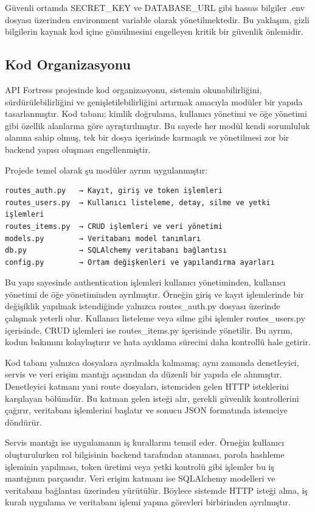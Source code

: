 Güvenli ortamda SECRET\_KEY ve DATABASE\_URL gibi hassas bilgiler .env dosyası üzerinden environment variable olarak yönetilmektedir. Bu yaklaşım, gizli bilgilerin kaynak kod içine gömülmesini engelleyen kritik bir güvenlik önlemidir.

\subsection{Kod Organizasyonu}
\label{kod-organizasyonu}

API Fortress projesinde kod organizasyonu, sistemin okunabilirliğini, sürdürülebilirliğini ve genişletilebilirliğini artırmak amacıyla modüler bir yapıda tasarlanmıştır. Kod tabanı; kimlik doğrulama, kullanıcı yönetimi ve öğe yönetimi gibi özellik alanlarına göre ayrıştırılmıştır. Bu sayede her modül kendi sorumluluk alanına sahip olmuş, tek bir dosya içerisinde karmaşık ve yönetilmesi zor bir backend yapısı oluşması engellenmiştir.

Projede temel olarak şu modüler ayrım uygulanmıştır:

\begin{verbatim}
routes_auth.py   → Kayıt, giriş ve token işlemleri
routes_users.py  → Kullanıcı listeleme, detay, silme ve yetki işlemleri
routes_items.py  → CRUD işlemleri ve veri yönetimi
models.py        → Veritabanı model tanımları
db.py            → SQLAlchemy veritabanı bağlantısı
config.py        → Ortam değişkenleri ve yapılandırma ayarları
\end{verbatim}

Bu yapı sayesinde authentication işlemleri kullanıcı yönetiminden, kullanıcı yönetimi de öğe yönetiminden ayrılmıştır. Örneğin giriş ve kayıt işlemlerinde bir değişiklik yapılmak istendiğinde yalnızca routes\_auth.py dosyası üzerinde çalışmak yeterli olur. Kullanıcı listeleme veya silme gibi işlemler routes\_users.py içerisinde, CRUD işlemleri ise routes\_items.py içerisinde yönetilir. Bu ayrım, kodun bakımını kolaylaştırır ve hata ayıklama sürecini daha kontrollü hale getirir.

Kod tabanı yalnızca dosyalara ayrılmakla kalmamış; aynı zamanda denetleyici, servis ve veri erişim mantığı açısından da düzenli bir yapıda ele alınmıştır. Denetleyici katmanı yani route dosyaları, istemciden gelen HTTP isteklerini karşılayan bölümdür. Bu katman gelen isteği alır, gerekli güvenlik kontrollerini çağırır, veritabanı işlemlerini başlatır ve sonucu JSON formatında istemciye döndürür.

Servis mantığı ise uygulamanın iş kurallarını temsil eder. Örneğin kullanıcı oluşturulurken rol bilgisinin backend tarafından atanması, parola hashleme işleminin yapılması, token üretimi veya yetki kontrolü gibi işlemler bu iş mantığının parçasıdır. Veri erişim katmanı ise SQLAlchemy modelleri ve veritabanı bağlantısı üzerinden yürütülür. Böylece sistemde HTTP isteği alma, iş kuralı uygulama ve veritabanı işlemi yapma görevleri birbirinden ayrılmıştır.

